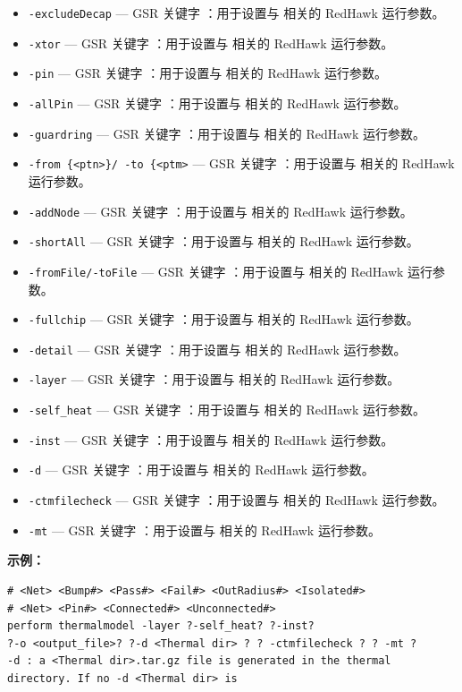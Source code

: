 \begin{itemize}
\item \texttt{-excludeDecap} — GSR 关键字 ：用于设置与  相关的 RedHawk 运行参数。
\item \texttt{-xtor} — GSR 关键字 ：用于设置与  相关的 RedHawk 运行参数。
\item \texttt{-pin} — GSR 关键字 ：用于设置与  相关的 RedHawk 运行参数。
\item \texttt{-allPin} — GSR 关键字 ：用于设置与  相关的 RedHawk 运行参数。
\item \texttt{-guardring} — GSR 关键字 ：用于设置与  相关的 RedHawk 运行参数。
\item \texttt{-from \{<ptn>\}/ -to \{<ptm>} — GSR 关键字 ：用于设置与  相关的 RedHawk 运行参数。
\item \texttt{-addNode} — GSR 关键字 ：用于设置与  相关的 RedHawk 运行参数。
\item \texttt{-shortAll} — GSR 关键字 ：用于设置与  相关的 RedHawk 运行参数。
\item \texttt{-fromFile/-toFile} — GSR 关键字 ：用于设置与  相关的 RedHawk 运行参数。
\item \texttt{-fullchip} — GSR 关键字 ：用于设置与  相关的 RedHawk 运行参数。
\item \texttt{-detail} — GSR 关键字 ：用于设置与  相关的 RedHawk 运行参数。
\item \texttt{-layer} — GSR 关键字 ：用于设置与  相关的 RedHawk 运行参数。
\item \texttt{-self\_heat} — GSR 关键字 ：用于设置与  相关的 RedHawk 运行参数。
\item \texttt{-inst} — GSR 关键字 ：用于设置与  相关的 RedHawk 运行参数。
\item \texttt{-d} — GSR 关键字 ：用于设置与  相关的 RedHawk 运行参数。
\item \texttt{-ctmfilecheck} — GSR 关键字 ：用于设置与  相关的 RedHawk 运行参数。
\item \texttt{-mt} — GSR 关键字 ：用于设置与  相关的 RedHawk 运行参数。
\end{itemize}

\textbf{示例：}
\begin{lstlisting}
# <Net> <Bump#> <Pass#> <Fail#> <OutRadius#> <Isolated#>
# <Net> <Pin#> <Connected#> <Unconnected#>
perform thermalmodel -layer ?-self_heat? ?-inst?
?-o <output_file>? ?-d <Thermal dir> ? ? -ctmfilecheck ? ? -mt ?
-d : a <Thermal dir>.tar.gz file is generated in the thermal directory. If no -d <Thermal dir> is
\end{lstlisting}

\subsection{}
